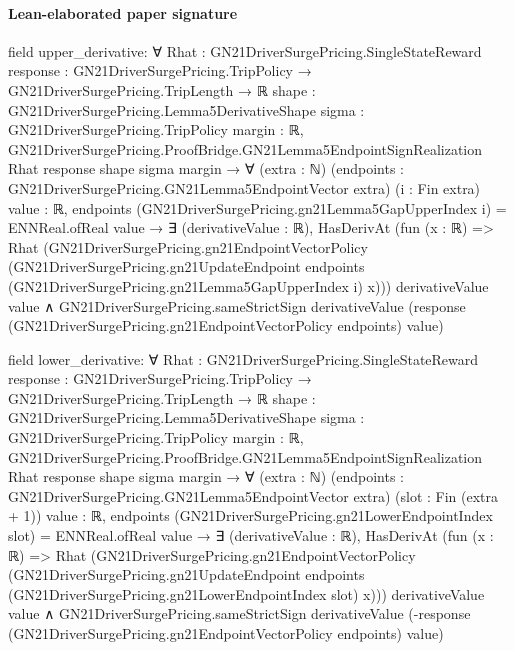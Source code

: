 \documentclass[10pt]{article}
\begin{document}
\paragraph{Lean-elaborated paper signature}
\begin{ReviewVerbatim}
field upper_derivative:
∀ {Rhat : GN21DriverSurgePricing.SingleStateReward}
  {response : GN21DriverSurgePricing.TripPolicy → GN21DriverSurgePricing.TripLength → ℝ}
  {shape : GN21DriverSurgePricing.Lemma5DerivativeShape} {sigma : GN21DriverSurgePricing.TripPolicy} {margin : ℝ},
  GN21DriverSurgePricing.ProofBridge.GN21Lemma5EndpointSignRealization Rhat response shape sigma margin →
    ∀ (extra : ℕ) (endpoints : GN21DriverSurgePricing.GN21Lemma5EndpointVector extra) (i : Fin extra) {value : ℝ},
      endpoints (GN21DriverSurgePricing.gn21Lemma5GapUpperIndex i) = ENNReal.ofReal value →
        ∃ (derivativeValue : ℝ),
          HasDerivAt
              (fun (x : ℝ) =>
                Rhat
                  (GN21DriverSurgePricing.gn21EndpointVectorPolicy
                    (GN21DriverSurgePricing.gn21UpdateEndpoint endpoints
                      (GN21DriverSurgePricing.gn21Lemma5GapUpperIndex i) x)))
              derivativeValue value ∧
            GN21DriverSurgePricing.sameStrictSign derivativeValue
              (response (GN21DriverSurgePricing.gn21EndpointVectorPolicy endpoints) value)

field lower_derivative:
∀ {Rhat : GN21DriverSurgePricing.SingleStateReward}
  {response : GN21DriverSurgePricing.TripPolicy → GN21DriverSurgePricing.TripLength → ℝ}
  {shape : GN21DriverSurgePricing.Lemma5DerivativeShape} {sigma : GN21DriverSurgePricing.TripPolicy} {margin : ℝ},
  GN21DriverSurgePricing.ProofBridge.GN21Lemma5EndpointSignRealization Rhat response shape sigma margin →
    ∀ (extra : ℕ) (endpoints : GN21DriverSurgePricing.GN21Lemma5EndpointVector extra) (slot : Fin (extra + 1))
      {value : ℝ},
      endpoints (GN21DriverSurgePricing.gn21LowerEndpointIndex slot) = ENNReal.ofReal value →
        ∃ (derivativeValue : ℝ),
          HasDerivAt
              (fun (x : ℝ) =>
                Rhat
                  (GN21DriverSurgePricing.gn21EndpointVectorPolicy
                    (GN21DriverSurgePricing.gn21UpdateEndpoint endpoints
                      (GN21DriverSurgePricing.gn21LowerEndpointIndex slot) x)))
              derivativeValue value ∧
            GN21DriverSurgePricing.sameStrictSign derivativeValue
              (-response (GN21DriverSurgePricing.gn21EndpointVectorPolicy endpoints) value)


\end{ReviewVerbatim}
\end{document}
